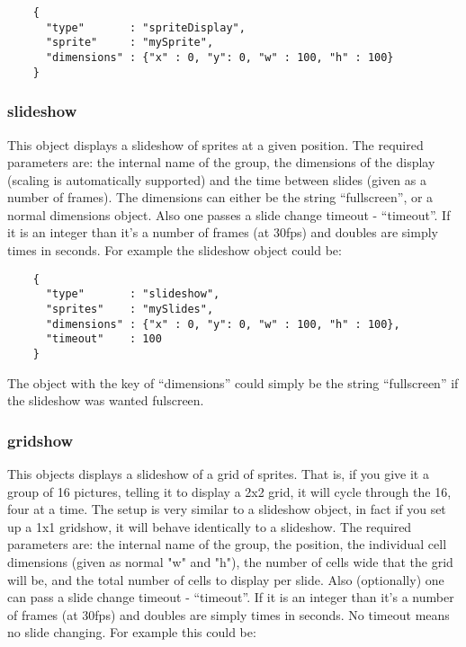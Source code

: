 \documentclass[a4paper]{article}
\begin{document}
  \begin{verbatim}
    {
      "type"       : "spriteDisplay",
      "sprite"     : "mySprite",
      "dimensions" : {"x" : 0, "y": 0, "w" : 100, "h" : 100}
    }
  \end{verbatim}

  \subsubsection{slideshow}
  This object displays a slideshow of sprites at a given position. The 
  required parameters are: the internal name of the group, the dimensions
  of the display (scaling is automatically supported) and the time between
  slides (given as a number of frames). The dimensions can either be the
  string ``fullscreen'', or a normal dimensions object. Also one passes a 
  slide change timeout - ``timeout''. If it is an integer than it's a 
  number of frames (at 30fps) and doubles are simply times in seconds.
  For example the slideshow object could be:

  \begin{verbatim}
    {
      "type"       : "slideshow",
      "sprites"    : "mySlides",
      "dimensions" : {"x" : 0, "y": 0, "w" : 100, "h" : 100},
      "timeout"    : 100
    }
  \end{verbatim}

  The object with the key of ``dimensions'' could simply be the string
  ``fullscreen'' if the slideshow was wanted fulscreen.

  \subsubsection{gridshow}
  This objects displays a slideshow of a grid of sprites. That is, if you
  give it a group of 16 pictures, telling it to display a 2x2 grid, it will
  cycle through the 16, four at a time. The setup is very similar to a
  slideshow object, in fact if you set up a 1x1 gridshow, it will behave
  identically to a slideshow.
  The required parameters are: the internal name of the group, the position,
  the individual cell dimensions (given as normal "w" and "h"), the number
  of cells wide that the grid will be, and the total number of cells to 
  display per slide. Also (optionally) one can pass a slide change timeout
  - ``timeout''. If it is an integer than it's a number of frames (at 30fps)
  and doubles are simply times in seconds. No timeout means no slide
  changing.
  For example this could be:
\end{document}
